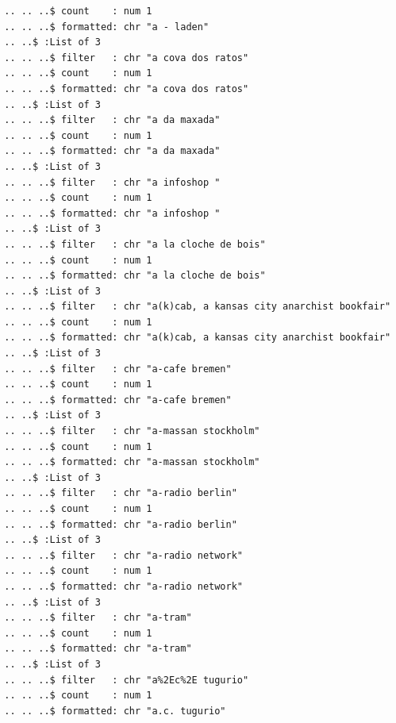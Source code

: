 \documentclass[
  letterpaper,
  DIV=11,
  numbers=noendperiod]{scrartcl}
\begin{document}
\begin{verbatim}
  .. .. ..$ count    : num 1
  .. .. ..$ formatted: chr "a - laden"
  .. ..$ :List of 3
  .. .. ..$ filter   : chr "a cova dos ratos"
  .. .. ..$ count    : num 1
  .. .. ..$ formatted: chr "a cova dos ratos"
  .. ..$ :List of 3
  .. .. ..$ filter   : chr "a da maxada"
  .. .. ..$ count    : num 1
  .. .. ..$ formatted: chr "a da maxada"
  .. ..$ :List of 3
  .. .. ..$ filter   : chr "a infoshop "
  .. .. ..$ count    : num 1
  .. .. ..$ formatted: chr "a infoshop "
  .. ..$ :List of 3
  .. .. ..$ filter   : chr "a la cloche de bois"
  .. .. ..$ count    : num 1
  .. .. ..$ formatted: chr "a la cloche de bois"
  .. ..$ :List of 3
  .. .. ..$ filter   : chr "a(k)cab, a kansas city anarchist bookfair"
  .. .. ..$ count    : num 1
  .. .. ..$ formatted: chr "a(k)cab, a kansas city anarchist bookfair"
  .. ..$ :List of 3
  .. .. ..$ filter   : chr "a-cafe bremen"
  .. .. ..$ count    : num 1
  .. .. ..$ formatted: chr "a-cafe bremen"
  .. ..$ :List of 3
  .. .. ..$ filter   : chr "a-massan stockholm"
  .. .. ..$ count    : num 1
  .. .. ..$ formatted: chr "a-massan stockholm"
  .. ..$ :List of 3
  .. .. ..$ filter   : chr "a-radio berlin"
  .. .. ..$ count    : num 1
  .. .. ..$ formatted: chr "a-radio berlin"
  .. ..$ :List of 3
  .. .. ..$ filter   : chr "a-radio network"
  .. .. ..$ count    : num 1
  .. .. ..$ formatted: chr "a-radio network"
  .. ..$ :List of 3
  .. .. ..$ filter   : chr "a-tram"
  .. .. ..$ count    : num 1
  .. .. ..$ formatted: chr "a-tram"
  .. ..$ :List of 3
  .. .. ..$ filter   : chr "a%2Ec%2E tugurio"
  .. .. ..$ count    : num 1
  .. .. ..$ formatted: chr "a.c. tugurio"
\end{verbatim}
\end{document}
